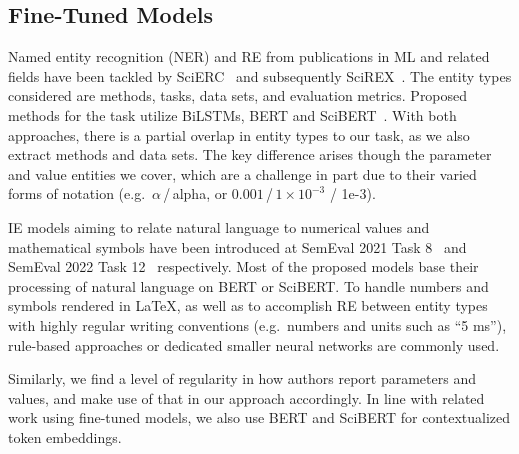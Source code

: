 

\subsection{Fine-Tuned Models}


Named entity recognition (NER) and RE from publications in ML and related fields have been tackled by SciERC~\cite{luan2018scierc} and subsequently SciREX~\cite{Jain2020scirex}. The entity types considered are methods, tasks, data sets, and evaluation metrics. Proposed methods for the task utilize BiLSTMs, BERT and SciBERT~\cite{Beltagy2019}. With both approaches, there is a partial overlap in entity types to our task, as we also extract methods and data sets. The key difference arises though the parameter and value entities we cover, which are a challenge in part due to their varied forms of notation (e.g.\ $\alpha$\,/\,alpha, or $0.001$\,/\,$1\times 10^{-3}$ / 1e-3).

IE models aiming to relate natural language to numerical values and mathematical symbols have been introduced at SemEval 2021 Task 8~\cite{semeval21_task8} and SemEval 2022 Task 12~\cite{semeval22_task12} respectively. Most of the proposed models base their processing of natural language on BERT or SciBERT. To handle numbers and symbols rendered in \LaTeX{}, as well as to accomplish RE between entity types with highly regular writing conventions (e.g.\ numbers and units such as ``5 ms''), rule-based approaches or dedicated smaller neural networks are commonly used.

Similarly, we find a level of regularity in how authors report parameters and values, and make use of that in our approach accordingly. In line with related work using fine-tuned models, we also use BERT and SciBERT for contextualized token embeddings.

